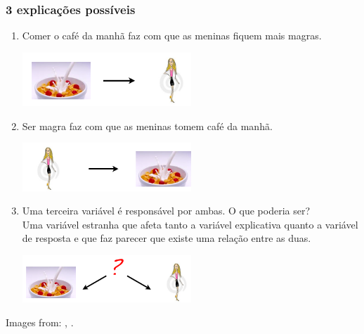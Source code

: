 \begin{frame}[shrink]
\frametitle{3 explicações possíveis}

\pause

\begin{enumerate}

\item Comer o café da manhã faz com que as meninas fiquem mais magras.
\begin{center}
\includegraphics[width=0.5\textwidth]{1-4_obs_studies_sampling/figures/breakfast/breakfast2.png}
\end{center}

\pause

\item Ser magra faz com que as meninas tomem café da manhã.
\begin{center}
\includegraphics[width=0.5\textwidth]{1-4_obs_studies_sampling/figures/breakfast/breakfast3.png}
\end{center}

\pause
\justifying
\item Uma terceira variável é responsável por ambas. O que poderia ser? \\
Uma variável estranha que afeta tanto a variável explicativa quanto a variável de resposta e que faz parecer que existe uma relação entre as duas.
\begin{center}
\includegraphics[width=0.5\textwidth]{1-4_obs_studies_sampling/figures/breakfast/breakfast4.png}
\end{center}

\end{enumerate}


{\tiny Images from: ,  .}



\end{frame}

